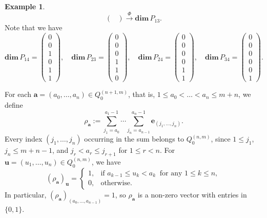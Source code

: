 \documentclass[11pt,a4paper]{amsart}
\theoremstyle{definition}
\newtheorem{example}[theorem]{Example}
\numberwithin{equation}{section}
\newcommand{\e}{\mathbf{e}}
\newcommand{\0}{\mathbf{0}}
\newcommand{\dimv}{\mathbf{dim}\,}
\begin{document}
\begin{example}
\[\begin{pmatrix}
		\end{pmatrix}
		\xrightarrow{\Phi}
		\dimv P_{13}.
		\]
		Note that we have \[
		\dimv P_{14}=
		\begin{pmatrix}
			0\\0\\1\\0\\1\\1
		\end{pmatrix},
		\quad
		\dimv P_{23}=
		\begin{pmatrix}
			0\\0\\0\\1\\1\\0
		\end{pmatrix},
		\quad
		\dimv P_{24}=
		\begin{pmatrix}
			0\\0\\0\\0\\1\\1
		\end{pmatrix},
		\quad
		\dimv P_{34}=
		\begin{pmatrix}
			0\\0\\0\\0\\0\\1
		\end{pmatrix}.
		\]
	
	\end{example}
	
	For each $\mathbf{a}=(a_0,\dots,a_{n})\in Q_0^{(n+1,m)}$, that is, $1\le a_0<\dots<a_n\le m+n$, we define
	\begin{equation*}
		\rho_{\mathbf{a}}
		:=\sum_{j_1=a_0}^{a_1-1}\cdots
		\sum_{j_n=a_{n-1}}^{a_n-1}\e_{(j_1,\ldots,j_n)}.
	\end{equation*}
	Every index $(j_1,\ldots,j_n)$ occurring in the sum belongs to
	$Q_0^{(n,m)}$, since $1\le j_1$, $j_n\le m+n-1$, and
	$j_r<a_r\le j_{r+1}$ for $1\le r<n$.
	For $\mathbf u=(u_1,\ldots,u_n)\in Q_0^{(n,m)}$, we have
	\[
	(\rho_{\mathbf a})_{\mathbf u}=
	\begin{cases}
		1,&\text{if }a_{k-1}\le u_k<a_k \
		\text{ for any }1\le k\le n,\\
		0,&\text{otherwise}.
	\end{cases}
	\]
	In particular,
	$(\rho_{\mathbf a})_{(a_0,\ldots,a_{n-1})}=1$,
	so $\rho_{\mathbf a}$ is a non-zero vector with entries in
	$\{0,1\}$.
	
\end{document}
